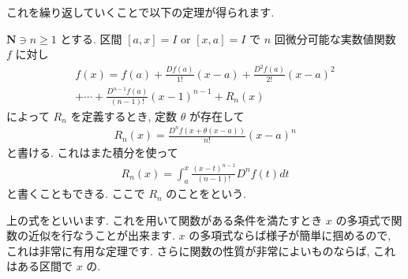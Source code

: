 \documentclass[openany, a4paper, oneside]{jsbook}
\begin{document}
これを繰り返していくことで以下の定理が得られます.
\begin{thm}
 $\bm{N} \ni n \geq 1$ とする.
区間 $[a,x]=I \,\, \mathrm{or} \,\, [x,a]=I$ で $n$ 回微分可能な実数値関数 $f$ に対し
\begin{align}
    f (x)=f (a) +\frac{Df (a)}{1!}(x-a) +\frac{D^2f (a)}{2!}(x-a)^2 \\
        +\dotsb +\frac{D^{n-1}f (a)}{(n-1)!}(x-1)^{n-1}+R_n (x)
\end{align}
によって $R_n$ を定義するとき, 定数 $\theta$ が存在して
\begin{align}
    R_n (x)=\frac{D^nf (x+\theta (x-a))}{n!}(x-a)^n
\end{align}
と書ける.
これはまた積分を使って
\begin{align}
  R_n (x)=\int_a^x \frac{(x-t)^{n-1}}{(n-1)!}D^nf (t) dt
\end{align}
と書くこともできる.
ここで $R_n$ のことをという.
\end{thm}

上の式をといいます. これを用いて関数がある条件を満たすとき
 $x$ の多項式で関数の近似を行なうことが出来ます.
 $x$ の多項式ならば様子が簡単に掴めるので, これは非常に有用な定理です.
さらに関数の性質が非常によいものならば, これはある区間で
 $x$ の.
\end{document}

